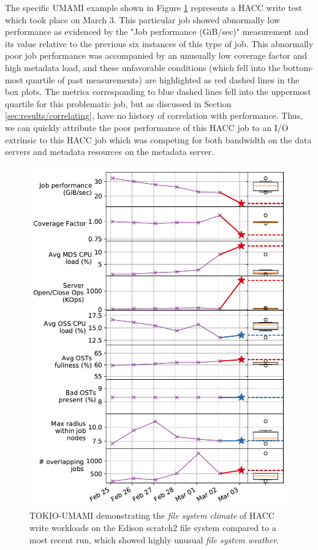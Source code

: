 \documentclass[conference,10pt,compsocconf]{IEEEtran}
\begin{document}
The specific UMAMI example shown in Figure \ref{fig:umami-scratch2-hacc-write} represents a HACC write test which took place on March 3.
This particular job showed abnormally low performance as evidenced by the "Job performance (GiB/sec)" measurement and its value relative to the previous six instances of this type of job.
This abnormally poor job performance was accompanied by an unusually low coverage factor and high metadata load, and these unfavorable conditions (which fell into the bottom-most quartile of past measurements) are highlighted as red dashed lines in the box plots.
The metrics corresponding to blue dashed lines fell into the uppermost quartile for this problematic job, but as discussed in Section \ref{sec:results/correlating}, have no history of correlation with performance.
Thus, we can quickly attribute the poor performance of this HACC job to an I/O extrinsic to this HACC job which was competing for both bandwidth on the data servers and metadata resources on the metadata server.

\begin{figure}[t]
    \centering
    \includegraphics[width=1.0\columnwidth]{figs/umami-scratch2-hacc-write.pdf}
    \caption{TOKIO-UMAMI demonstrating the \emph{file system climate} of HACC write workloads
    on the Edison scratch2 file system compared to a most recent run, which showed
    highly unusual \emph{file system weather}.}
    \label{fig:umami-scratch2-hacc-write}
\end{figure}
\end{document}
